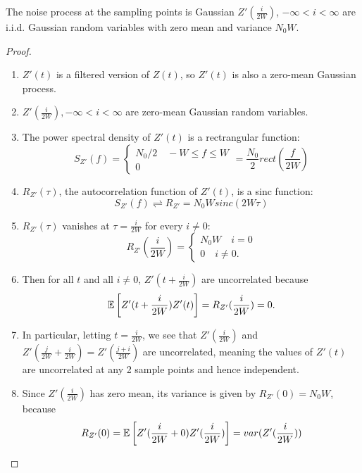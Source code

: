 \documentclass[../main.tex]{subfiles}
\begin{document}
\begin{bbox}{The noise process at the sampling points is Gaussian}
    $Z'(\frac{i}{2W})$, $-\infty < i <\infty$ are i.i.d. Gaussian random variables with zero mean and variance $N_0W$.
    \begin{proof}
        \begin{enumerate}
            \item $Z'(t)$ is a filtered version of $Z(t)$, so $Z'(t)$ is also a zero-mean Gaussian process.
            \item $Z'(\frac{i}{2W}), -\infty < i<\infty$ are zero-mean Gaussian random variables. 
            \item The power spectral density of $Z'(t)$ is a rectrangular function:
            \[
                S_{Z'}(f)=\begin{cases}
                    N_0/2 \quad -W\leq f\leq W\\
                    0
                \end{cases} = \frac{N_0}{2}rect(\frac{f}{2W})
            \]
        \item $R_{Z'}(\tau)$, the autocorrelation function of $Z'(t)$, is a sinc function: \[
        S_{Z'}(f)\rightleftharpoons R_{Z'} = N_0Wsinc(2W\tau)
        \]
        \item $R_{Z'}(\tau)$ vanishes at $\tau =\frac{i}{2W}$ for every $i\neq 0$: \[
        R_{Z'}(\frac{i}{2W})=\begin{cases}
            N_0W \quad i=0\\
            0\quad i\neq 0.
        \end{cases}
        \]
        \item Then for all $t$ and all $i\neq 0$, $Z'(t+\frac{i}{2W})$ are uncorrelated because \[
        \mathbb{E}\left[Z'(t+\frac{i}{2W})Z'(t)\right] = R_{Z'}(\frac{i}{2W})=0.
        \]
        \item In particular, letting $t=\frac{i}{2W}$, we see that $Z'(\frac{i}{2W})$ and $Z'(\frac{j}{2W}+\frac{i}{2W})=Z'(\frac{j+i}{2W})$ are uncorrelated, meaning the values of $Z'(t)$ are uncorrelated at any 2 sample points and hence independent.
        \item Since $Z'(\frac{i}{2W})$ has zero mean, its variance is given by $R_{Z'}(0)=N_0 W$, because \[
        R_{Z'}(0)=\mathbb{E} \left[Z'(\frac{i}{2W}+0)Z'(\frac{i}{2W})\right] = var(Z'(\frac{i}{2W}))
        \]
        \end{enumerate}
    \end{proof}
\end{bbox}
\end{document}
